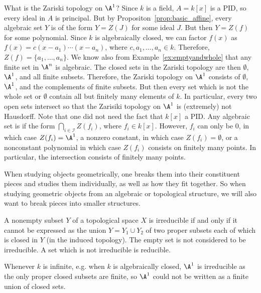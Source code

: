 \begin{ex}
What is the Zariski topology on $\A^1$? Since $k$ is a field, $A= k[x]$ is a PID, so every ideal in $A$ is principal. But by Propositon~\ref{prop:basic_affine}, every algebraic set $Y$ is of the form $Y= Z(J)$ for some ideal $J$. But then $Y=Z(f)$ for some polynomial. Since $k$ is algebraically closed, we can factor $f(x)$ as $f(x)= c(x-a_1)\cdots(x-a_n)$, where $c, a_1,\ldots,a_n \in k$. Therefore, $Z(f)= \{a_1,\ldots,a_n\}$. We know also from Example~\ref{ex:emptyandwhole} that any finite set in $\A^n$ is algebraic. The closed sets in the Zariski topology are then $\emptyset$, $\A^1$, and all finite subsets. Therefore, the Zariski topology on $\A^1$ consists of $\emptyset$, $\A^1$, and the complements of finite subsets. But then every set which is not the whole set or $\emptyset$ contain all but finitely many elements of $k$. In particular, every two open sets intersect so that the Zarisiki topology on $\A^1$ is (extremely) not Hausdorff. Note that one did not need the fact that $k[x]$ a PID. Any algebraic set is if the form $\bigcap_{i \in \mathcal{I}} Z(f_i)$, where $f_i \in k[x]$. However, $f_i$ can only be 0, in which case $Z(f_i)= \A^1$, a nonzero constant, in which case $Z(f_i)= \emptyset$, or a nonconstant polynomial in which case $Z(f_i)$ consists on finitely many points. In particular, the intersection consists of finitely many points. \xqed
\end{ex}


When studying objects geometrically, one breaks them into their constituent pieces and studies them individually, as well as how they fit together. So when studying geometric objects from an algebraic or topological structure, we will also want to break pieces into smaller structures.


\begin{dfn}[Irreducible]
A nonempty subset $Y$ of a topological space $X$ is irreducible if and only if it cannot be expressed as the union $Y= Y_1 \cup Y_2$ of two proper subsets each of which is closed in $Y$ (in the induced topology). The empty set is not considered to be irreducible. A set which is not irreducible is reducible. 
\end{dfn}


\begin{ex}
Whenever $k$ is infinite, e.g. when $k$ is algebraically closed, $\A^1$ is irreducible as the only proper closed subsets are finite, so $\A^1$ could not be written as a finite union of closed sets. \xqed
\end{ex}


